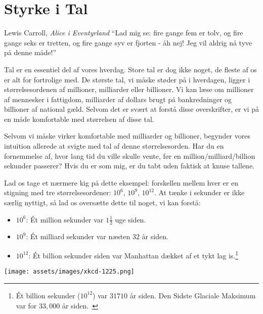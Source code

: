 \chapter{Styrke i Tal}
\label{les:15}

\begin{chapquote}{Lewis Carroll, \textit{Alice i Eventyrland}}
\enquote{Lad mig se: fire gange fem er tolv, og fire gange seks er tretten, 
og fire gange syv er fjorten - åh nej! Jeg vil aldrig nå tyve på denne måde!}
\end{chapquote}

Tal er en essentiel del af vores hverdag. Store tal er dog ikke noget, de 
fleste af os er alt for fortrolige med. De største tal, vi måske støder på 
i hverdagen, ligger i størrelsesordenen af millioner, milliarder eller 
billioner. Vi kan læse om millioner af mennesker i fattigdom, milliarder af 
dollars brugt på bankredninger og billioner af national gæld. Selvom det er 
svært at forstå disse overskrifter, er vi på en måde komfortable med 
størrelsen af disse tal.

Selvom vi måske virker komfortable med milliarder og billioner, begynder 
vores intuition allerede at svigte med tal af denne størrelsesorden. Har 
du en fornemmelse af, hvor lang tid du ville skulle vente, før en 
million/milliard/billion sekunder passerer? Hvis du er som mig, er du tabt 
uden faktisk at knuse tallene.

Lad os tage et nærmere kig på dette eksempel: forskellen mellem hver er en 
stigning med tre størrelsesordener: $10^6$, $10^9$, $10^{12}$. At tænke i
sekunder er ikke særlig nyttigt, så lad os oversætte dette til noget, vi 
kan forstå:

\begin{itemize}
  \item $10^6$: Ét million sekunder var $1 \frac{1}{2}$ uge siden.
  \item $10^9$: Ét milliard sekunder var næsten 32 år siden.
  \item $10^{12}$: Ét billion sekunder siden var Manhattan dækket af et tykt lag
  is.\footnote{Ét billion sekunder ($10^{12}$) var $31710$ år siden. Den Sidste 
  Glaciale Maksimum var for $33,000$ år siden.~\cite{wiki:LGM}}
\end{itemize}

\begin{center}
  \texttt{[image: assets/images/xkcd-1225.png]}
  \label{fig:xkcd-1225}
\end{center}

